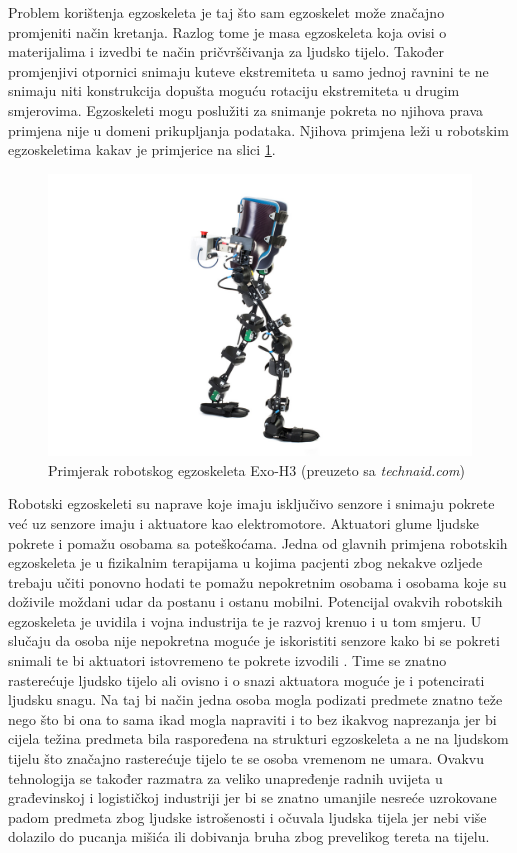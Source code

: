 \documentclass[times, utf8, diplomski]{fer}
\begin{document}
Problem korištenja egzoskeleta je taj što sam egzoskelet može značajno promjeniti način kretanja. Razlog tome je masa egzoskeleta
koja ovisi o materijalima i izvedbi te način pričvrščivanja za ljudsko tijelo. Također promjenjivi otpornici snimaju kuteve 
ekstremiteta u samo jednoj ravnini te ne snimaju niti konstrukcija dopušta moguću rotaciju ekstremiteta u drugim smjerovima.
Egzoskeleti mogu poslužiti za snimanje pokreta no njihova prava primjena nije u domeni prikupljanja podataka. Njihova primjena 
leži u robotskim egzoskeletima kakav je primjerice na slici \ref{exoskeleton}.

\begin{figure}
    \includegraphics[width=\textwidth]{exoskeleton.jpg}
    \caption{Primjerak robotskog egzoskeleta Exo-H3 (preuzeto sa \textit{technaid.com})}
    \label{exoskeleton}
\end{figure}

Robotski egzoskeleti su naprave koje imaju isključivo senzore i snimaju pokrete već uz senzore imaju i aktuatore kao elektromotore.
Aktuatori glume ljudske pokrete i pomažu osobama sa poteškoćama. Jedna od glavnih primjena robotskih egzoskeleta je u fizikalnim
terapijama u kojima pacjenti zbog nekakve ozljede trebaju učiti ponovno hodati te pomažu nepokretnim osobama i osobama koje su
doživile moždani udar da postanu i ostanu mobilni. Potencijal ovakvih robotskih egzoskeleta je uvidila i vojna industrija te
je razvoj krenuo i u tom smjeru. U slučaju da osoba nije nepokretna moguće je iskoristiti senzore kako bi se pokreti snimali te
bi aktuatori istovremeno te pokrete izvodili \citep{exo}. Time se znatno rasterećuje ljudsko tijelo ali ovisno i o snazi aktuatora moguće je i
potencirati ljudsku snagu. Na taj bi način jedna osoba mogla podizati predmete znatno teže nego što bi ona to sama ikad mogla
napraviti i to bez ikakvog naprezanja jer bi cijela težina predmeta bila raspoređena na strukturi egzoskeleta a ne na ljudskom 
tijelu što značajno rasterećuje tijelo te se osoba vremenom ne umara. Ovakvu tehnologija se također razmatra za veliko unapređenje
radnih uvijeta u građevinskoj i logističkoj industriji jer bi se znatno umanjile nesreće uzrokovane padom predmeta zbog ljudske
istrošenosti i očuvala ljudska tijela jer nebi više dolazilo do pucanja mišića ili dobivanja bruha zbog prevelikog tereta na tijelu.
\end{document}
